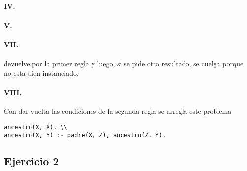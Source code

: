 \documentclass[10pt,a4paper]{article}
\begin{document}
\paragraph{IV.} 
\paragraph{V.} 
\paragraph{VII.}  devuelve  por la primer regla y luego, si se pide otro resultado, se cuelga porque  no está bien instanciado.
\paragraph{VIII.} Con dar vuelta las condiciones de la segunda regla se arregla este problema
\begin{centrado}
\begin{verbatim}
ancestro(X, X). \\
ancestro(X, Y) :- padre(X, Z), ancestro(Z, Y).
\end{verbatim}
\end{centrado}

\newpage
\subsection{Ejercicio 2}
\end{document}
